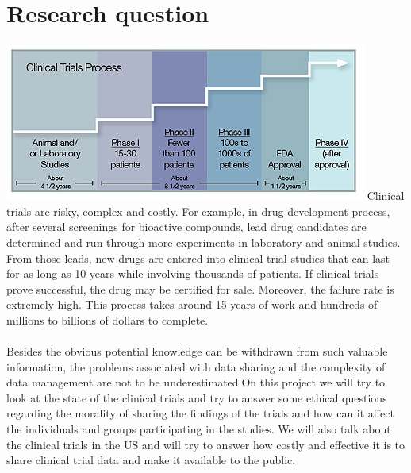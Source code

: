\documentclass[paper=a4, fontsize=12pt]{article}
\begin{document}
\section*{Research question}
\includegraphics[width=\textwidth]{trialprocess}
Clinical trials are risky, complex and costly. For example, in drug development process, after several screenings for bioactive compounds, lead drug candidates are determined and run through more experiments in laboratory and animal studies. From those leads, new drugs are entered into clinical trial studies that can last for as long as 10 years while involving thousands of patients. If clinical trials prove successful, the drug may be certified for sale. Moreover, the failure rate is extremely high. This process takes around 15 years of work and hundreds of millions to billions of dollars to complete.\\\\
Besides the obvious potential knowledge can be withdrawn from such valuable information, the problems associated with data sharing and the complexity of data management are not to be underestimated.On this project we will try to look at the state of the clinical trials and try to answer some ethical questions regarding the morality of sharing the findings of the trials and how can it affect the individuals and groups participating in the studies. We will also talk about the clinical trials in the US and will try to answer how costly and effective it is to share clinical trial data and make it available to the public.\\\\
\end{document}
